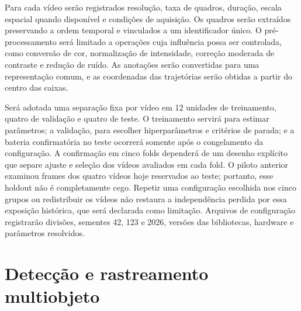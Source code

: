 Para cada vídeo serão registrados resolução, taxa de quadros, duração, escala espacial quando disponível e condições de aquisição. Os quadros serão extraídos preservando a ordem temporal e vinculados a um identificador único. O pré-processamento será limitado a operações cuja influência possa ser controlada, como conversão de cor, normalização de intensidade, correção moderada de contraste e redução de ruído. As anotações serão convertidas para uma representação comum, e as coordenadas das trajetórias serão obtidas a partir do centro das caixas.

Será adotada uma separação fixa por vídeo em 12 unidades de treinamento, quatro de validação e quatro de teste. O treinamento servirá para estimar parâmetros; a validação, para escolher hiperparâmetros e critérios de parada; e a bateria confirmatória no teste ocorrerá somente após o congelamento da configuração. A confirmação em cinco folds dependerá de um desenho explícito que separe ajuste e seleção dos vídeos avaliados em cada fold. O piloto anterior examinou frames dos quatro vídeos hoje reservados ao teste; portanto, esse holdout não é completamente cego. Repetir uma configuração escolhida nos cinco grupos ou redistribuir os vídeos não restaura a independência perdida por essa exposição histórica, que será declarada como limitação. Arquivos de configuração registrarão divisões, sementes 42, 123 e 2026, versões das bibliotecas, hardware e parâmetros resolvidos.

\section{Detecção e rastreamento multiobjeto}

